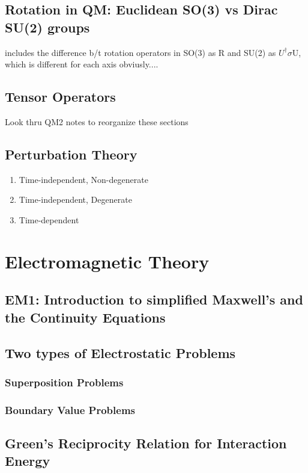 \documentclass[]{article}
\begin{document}
\subsection{Rotation in QM: Euclidean SO(3) vs Dirac SU(2) groups}
includes the difference b/t rotation operators in SO(3) as R and SU(2) as $U^\dagger\sigma$U, which is different for each axis obviusly....
\subsection{Tensor Operators}
Look thru QM2 notes to reorganize these sections
\subsection{Perturbation Theory}
\begin{enumerate}
	\item Time-independent, Non-degenerate 
	\item Time-independent, Degenerate
	\item Time-dependent
\end{enumerate}

\section{Electromagnetic Theory}
\subsection{EM1: Introduction to simplified Maxwell's and the Continuity Equations}

\subsection{Two types of Electrostatic Problems}
\subsubsection{Superposition Problems}
\subsubsection{Boundary Value Problems}

\subsection{Green's Reciprocity Relation for Interaction Energy}
\end{document}
